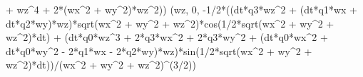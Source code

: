 \documentclass[]{article}
\newenvironment{Shaded}{}{}
\newcommand{\DecValTok}[1]{\textcolor[rgb]{0.25,0.63,0.44}{#1}}
\newcommand{\OperatorTok}[1]{\textcolor[rgb]{0.40,0.40,0.40}{#1}}
\newcommand{\NormalTok}[1]{#1}
\begin{document}
\begin{Shaded}
\begin{Highlighting}[]
\OperatorTok{+}\NormalTok{ wz}\OperatorTok{^}\DecValTok{4} \OperatorTok{+} \DecValTok{2}\OperatorTok{*}\NormalTok{(wx}\OperatorTok{^}\DecValTok{2} \OperatorTok{+}\NormalTok{ wy}\OperatorTok{^}\DecValTok{2}\NormalTok{)}\OperatorTok{*}\NormalTok{wz}\OperatorTok{^}\DecValTok{2}\NormalTok{))}
\NormalTok{(wz, }\DecValTok{0}\NormalTok{, }\OperatorTok{-}\DecValTok{1}\OperatorTok{/}\DecValTok{2}\OperatorTok{*}\NormalTok{((dt}\OperatorTok{*}\NormalTok{q3}\OperatorTok{*}\NormalTok{wz}\OperatorTok{^}\DecValTok{2} \OperatorTok{+}\NormalTok{ (dt}\OperatorTok{*}\NormalTok{q1}\OperatorTok{*}\NormalTok{wx }\OperatorTok{+}\NormalTok{ dt}\OperatorTok{*}\NormalTok{q2}\OperatorTok{*}\NormalTok{wy)}\OperatorTok{*}\NormalTok{wz)}\OperatorTok{*}\NormalTok{sqrt(wx}\OperatorTok{^}\DecValTok{2} \OperatorTok{+}\NormalTok{ wy}\OperatorTok{^}\DecValTok{2} \OperatorTok{+}\NormalTok{ wz}\OperatorTok{^}\DecValTok{2}\NormalTok{)}\OperatorTok{*}\NormalTok{cos(}\DecValTok{1}\OperatorTok{/}\DecValTok{2}\OperatorTok{*}\NormalTok{sqrt(wx}\OperatorTok{^}\DecValTok{2} \OperatorTok{+}\NormalTok{ wy}\OperatorTok{^}\DecValTok{2} \OperatorTok{+}\NormalTok{ wz}\OperatorTok{^}\DecValTok{2}\NormalTok{)}\OperatorTok{*}\NormalTok{dt) }\OperatorTok{+}\NormalTok{ (dt}\OperatorTok{*}\NormalTok{q0}\OperatorTok{*}\NormalTok{wz}\OperatorTok{^}\DecValTok{3} \OperatorTok{+} \DecValTok{2}\OperatorTok{*}\NormalTok{q3}\OperatorTok{*}\NormalTok{wx}\OperatorTok{^}\DecValTok{2} \OperatorTok{+} \DecValTok{2}\OperatorTok{*}\NormalTok{q3}\OperatorTok{*}\NormalTok{wy}\OperatorTok{^}\DecValTok{2} \OperatorTok{+}\NormalTok{ (dt}\OperatorTok{*}\NormalTok{q0}\OperatorTok{*}\NormalTok{wx}\OperatorTok{^}\DecValTok{2} \OperatorTok{+}\NormalTok{ dt}\OperatorTok{*}\NormalTok{q0}\OperatorTok{*}\NormalTok{wy}\OperatorTok{^}\DecValTok{2} \OperatorTok{-} \DecValTok{2}\OperatorTok{*}\NormalTok{q1}\OperatorTok{*}\NormalTok{wx }\OperatorTok{-} \DecValTok{2}\OperatorTok{*}\NormalTok{q2}\OperatorTok{*}\NormalTok{wy)}\OperatorTok{*}\NormalTok{wz)}\OperatorTok{*}\NormalTok{sin(}\DecValTok{1}\OperatorTok{/}\DecValTok{2}\OperatorTok{*}\NormalTok{sqrt(wx}\OperatorTok{^}\DecValTok{2} \OperatorTok{+}\NormalTok{ wy}\OperatorTok{^}\DecValTok{2} \OperatorTok{+}\NormalTok{ wz}\OperatorTok{^}\DecValTok{2}\NormalTok{)}\OperatorTok{*}\NormalTok{dt))}\OperatorTok{/}\NormalTok{(wx}\OperatorTok{^}\DecValTok{2} \OperatorTok{+}\NormalTok{ wy}\OperatorTok{^}\DecValTok{2} \OperatorTok{+}\NormalTok{ wz}\OperatorTok{^}\DecValTok{2}\NormalTok{)}\OperatorTok{^}\NormalTok{(}\DecValTok{3}\OperatorTok{/}\DecValTok{2}\NormalTok{))}

\end{Highlighting}
\end{Shaded}
\end{document}
